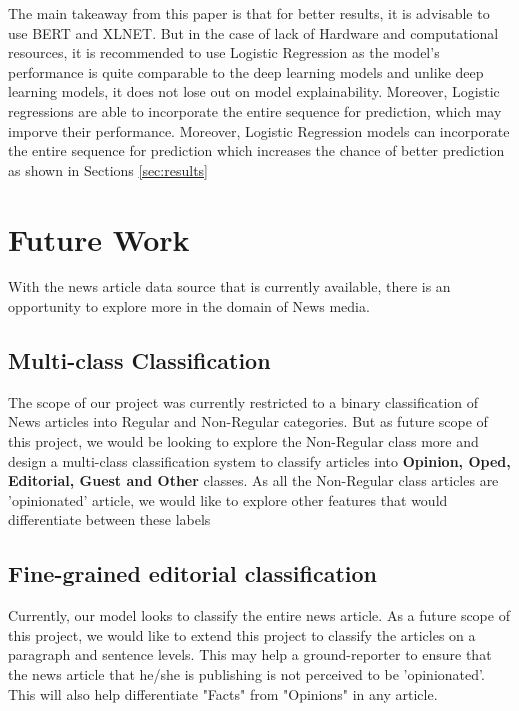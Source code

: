 \documentclass[11pt]{article}
\begin{document}
The main takeaway from this paper is that for better results, it is advisable to use BERT and XLNET. But in the case of lack of Hardware and computational resources, it is recommended to use Logistic Regression as the model's performance is quite comparable to the deep learning models and unlike deep learning models, it does not lose out on model explainability. Moreover, Logistic regressions are able to incorporate the entire sequence for prediction, which may imporve their performance. Moreover, Logistic Regression models can incorporate the entire sequence for prediction which increases the chance of better prediction as shown in Sections \ref{sec:results}




\section{Future Work}
\label{sec:future}


With the news article data source that is currently available, there is an opportunity to explore more in the domain of News media.

\subsection{Multi-class Classification}

The scope of our project was currently restricted to a binary classification of News articles into Regular and Non-Regular categories. But as future scope of this project, we would be looking to explore the Non-Regular class more and design a multi-class classification system to classify articles into \textbf{Opinion, Oped, Editorial, Guest and Other} classes. As all the Non-Regular class articles are 'opinionated' article, we would like to explore other features that would differentiate between these labels

\subsection{Fine-grained editorial classification}

Currently, our model looks to classify the entire news article. As a future scope of this project, we would like to extend this project to classify the articles on a paragraph and sentence levels. This may help a ground-reporter to ensure that the news article that he/she is publishing is not perceived to be 'opinionated'. This will also help differentiate "Facts" from "Opinions" in any article.
\end{document}
